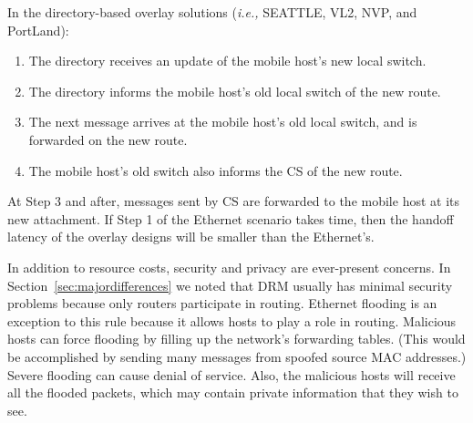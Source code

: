 In the directory-based overlay solutions ({\it i.e.,}
SEATTLE, VL2, NVP, and PortLand):
\begin{enumerate}
\item
The directory receives an update of the mobile host's new local switch.
\item
The directory informs the mobile host's old local switch of the new route.
\item
The next message arrives at the mobile host's old local switch, and
is forwarded on the new route.
\item
The mobile host's old switch also informs the CS of the new route.
\end{enumerate}
At Step 3 and after, messages sent by CS are forwarded to the mobile
host at its new attachment.
If Step 1 of the Ethernet scenario takes time, then the handoff latency
of the overlay designs will be smaller than the Ethernet's.

In addition to resource costs,
security and privacy are ever-present concerns.
In Section~\ref{sec:majordifferences} we noted that DRM usually
has minimal security problems because only routers participate
in routing.
Ethernet flooding is an exception to this rule because 
it allows hosts to play a role in routing.
Malicious
hosts can force flooding by filling up the network's forwarding tables.
(This would be accomplished by sending many messages from spoofed
source MAC addresses.)
Severe flooding can cause denial of service.
Also, the
malicious hosts will receive all the flooded packets, which
may contain private information that they wish to see.
